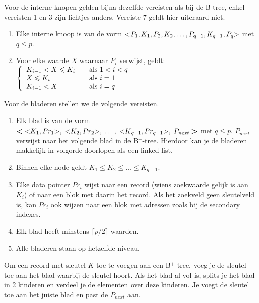 Voor de interne knopen gelden bijna dezelfde vereisten als bij de B-tree, enkel vereisten 1 en 3 zijn lichtjes anders. Vereiste 7 geldt hier uiteraard niet.
\begin{enumerate}
	\item Elke interne knoop is van de vorm $\text{\textless} P_1, K_1, P_2, K_2, \dots, P_{q-1}, K_{q-1}, P_q \text{\textgreater}$ met $q \leqslant p$.

	\setcounter{enumi}{2}
	\vspace{-1mm}
	\item Voor elke waarde $X$ waarnaar $P_i$ verwijst, geldt: $
	\left\{
		\begin{array}{l l}
			K_{i-1} < X \leqslant K_i	& \quad \text{als } 1<i<q\\
			X \leqslant K_i				& \quad \text{als }i=1\\
			K_{i-1} < X					& \quad \text{als }i=q\\
		\end{array}
	\right.$
\end{enumerate}\vspace{1mm}
Voor de bladeren stellen we de volgende vereisten.
\begin{enumerate}
	\item Elk blad is van de vorm $\textbf{\textless} \; \text{\textless} K_1, Pr_1 \text{\textgreater}, \; \text{\textless} K_2, Pr_2 \text{\textgreater}, \;\dots, \; \text{\textless} K_{q-1}, Pr_{q-1} \text{\textgreater}, \; P_\textit{next} \; \textbf{\textgreater}$ met $q \leqslant p$. $P_\textit{next}$ verwijst naar het volgende blad in de B$^+$-tree. Hierdoor kan je de bladeren makkelijk in volgorde doorlopen als een linked list.

	\item Binnen elke node geldt $K_1 \leqslant K_2 \leqslant \dots \leqslant K_{q-1}$.
	
	\item Elke data pointer $Pr_i$ wijst naar een record (wiens zoekwaarde gelijk is aan $K_i$) of naar een blok met daarin het record. Als het zoekveld geen sleutelveld is, kan $Pr_i$ ook wijzen naar een blok met adressen zoals bij de secondary indexes.
	
	\item Elk blad heeft minstens $\lceil p/2 \rceil$ waarden.
	\item Alle bladeren staan op hetzelfde niveau.
\end{enumerate}\vspace{1mm}
Om een record met sleutel $K$ toe te voegen aan een B$^+$-tree, voeg je de sleutel toe aan het blad waarbij de sleutel hoort. Als het blad al vol is, splits je het blad in 2 kinderen en verdeel je de elementen over deze kinderen. Je voegt de sleutel toe aan het juiste blad en past de $P_\textit{next}$ aan.

